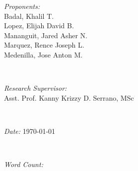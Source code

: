 \begin{titlepage}

\begin{minipage}{0.4\textwidth}
\begin{flushleft} %
\emph{Proponents:} \\  %
Badal, Khalil T. \\[0.2em]
Lopez, Elijah David B.\\[0.2em]
Mananguit, Jared Asher N. \\[0.2em]
Marquez, Rence Joseph L. \\[0.2em]
Medenilla, Jose Anton M.\\[0.2em]
\end{flushleft}
\end{minipage}
~
\begin{minipage}{0.4\textwidth}
\begin{flushright} %
\emph{Research Supervisor:}\\
Asst. Prof. Kanny Krizzy D. Serrano, MSc \\[0.2em] %
\end{flushright}
\end{minipage}\\[1.5cm]
\makeatother

\begin{minipage}{0.4\textwidth}
\begin{flushleft} %
\emph{Date: }{ \today} %
\end{flushleft}
\end{minipage}
~
\begin{minipage}{0.4\textwidth}
\begin{flushright}%
\emph{Word Count: }{\automatedwordcount} %
\end{flushright}
\end{minipage}\\[1cm]

\vfill %

\end{titlepage}
